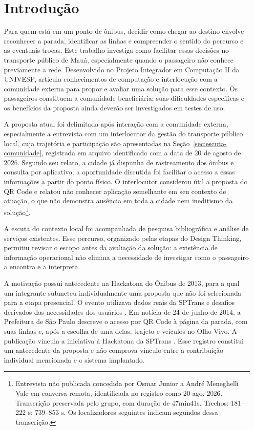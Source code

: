 \documentclass[12pt,oneside,a4paper,brazil,chapter=TITLE]{abntex2}
\begin{document}
\textual
\OnehalfSpacing
\pagestyle{papnumeracao}
\setcounter{page}{1}
\chapter{Introdução}
Para quem está em um ponto de ônibus, decidir como chegar ao destino envolve reconhecer a parada, identificar as linhas e compreender o sentido do percurso e as eventuais trocas. Este trabalho investiga como facilitar essas decisões no transporte público de Mauá, especialmente quando o passageiro não conhece previamente a rede. Desenvolvido no Projeto Integrador em Computação II da UNIVESP, articula conhecimentos de computação e interlocução com a comunidade externa para propor e avaliar uma solução para esse contexto. Os passageiros constituem a comunidade beneficiária; suas dificuldades específicas e os benefícios da proposta ainda deverão ser investigados em testes de uso.

A proposta atual foi delimitada após interação com a comunidade externa, especialmente a entrevista com um interlocutor da gestão do transporte público local, cuja trajetória e participação são apresentadas na Seção~\ref{sec:escuta-comunidade}, registrada em arquivo identificado com a data de 20 de agosto de 2026. Segundo seu relato, a cidade já dispunha de rastreamento dos ônibus e consulta por aplicativo; a oportunidade discutida foi facilitar o acesso a essas informações a partir do ponto físico. O interlocutor considerou útil a proposta do QR Code e relatou não conhecer aplicação semelhante em seu contexto de atuação, o que não demonstra ausência em toda a cidade nem ineditismo da solução\footnote{Entrevista não publicada concedida por Osmar Junior a André Meneghelli Vale em conversa remota, identificada no registro como 20 ago. 2026. Transcrição preservada pelo grupo, com duração de 47min41s. Trechos: 181--222 s; 739--853 s. Os localizadores seguintes indicam segundos dessa transcrição.}.

A escuta do contexto local foi acompanhada de pesquisa bibliográfica e análise de serviços existentes. Esse percurso, organizado pelas etapas do Design Thinking, permitiu revisar o escopo antes da avaliação da solução: a existência de informação operacional não elimina a necessidade de investigar como o passageiro a encontra e a interpreta.

A motivação possui antecedente na Hackatona do Ônibus de 2013, para a qual um integrante submeteu individualmente uma proposta que não foi selecionada para a etapa presencial. O evento utilizava dados reais da SPTrans e desafios derivados das necessidades dos usuários \citep{hackatona2013}. Em notícia de 24 de junho de 2014, a Prefeitura de São Paulo descreve o acesso por QR Code à página da parada, com suas linhas e, após a escolha de uma delas, trajeto e veículos no Olho Vivo. A publicação vincula a iniciativa à Hackatona da SPTrans \citep{qrsptrans2014}. Esse registro constitui um antecedente da proposta e não comprova vínculo entre a contribuição individual mencionada e o sistema implantado.
\end{document}

